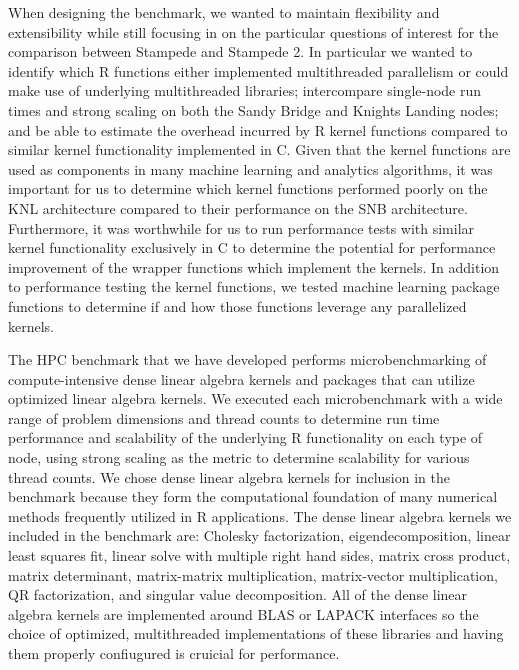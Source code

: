 When designing the benchmark, we wanted to maintain flexibility and extensibility while
still focusing in on the particular questions of interest for the comparison between
Stampede and Stampede 2. In particular we wanted to identify which R functions either
implemented multithreaded parallelism or could make use of underlying multithreaded
libraries; intercompare single-node run times and strong scaling on both the Sandy Bridge
and Knights Landing nodes; and be able to estimate the overhead incurred by R kernel
functions compared to similar kernel functionality implemented in C. Given that the kernel
functions are used as components in many machine learning and analytics algorithms, it was
important for us to determine which kernel functions performed poorly on the KNL
architecture compared to their performance on the SNB architecture. Furthermore, it was
worthwhile for us to run performance tests with similar kernel functionality exclusively
in C to determine the potential for performance improvement of the wrapper functions which
implement the kernels. In addition to performance testing the kernel functions, we tested
machine learning package functions to determine if and how those functions leverage any
parallelized kernels.

The HPC benchmark that we have developed performs microbenchmarking of compute-intensive
dense linear algebra kernels and packages that can utilize optimized linear algebra
kernels. We executed each microbenchmark with a wide range of problem dimensions and
thread counts to determine run time performance and scalability of the underlying R
functionality on each type of node, using strong scaling as the metric to determine
scalability for various thread counts.
We chose dense linear algebra kernels for inclusion in the benchmark because they form the
computational foundation of many numerical methods frequently utilized in R applications.
The dense linear algebra kernels we included in the benchmark are: Cholesky factorization,
eigendecomposition, linear least squares fit, linear solve with multiple right hand sides, matrix cross product,
matrix determinant, matrix-matrix multiplication, matrix-vector multiplication, QR
factorization, and singular value decomposition.
All of the dense linear algebra kernels are implemented around BLAS or LAPACK interfaces
  so the choice of optimized, multithreaded implementations of these libraries and
  having them properly confiugured is cruicial for performance.


